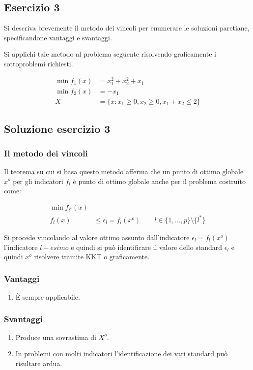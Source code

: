 \documentclass[\main/main.tex]{subfiles}
\begin{document}
\subsection{Esercizio 3}
Si descriva brevemente il metodo dei vincoli per enumerare le soluzioni paretiane, specificandone vantaggi e svantaggi.

Si applichi tale metodo al problema seguente risolvendo graficamente i sottoproblemi richiesti.

\begin{align*}
  \min f_1(x) & = x_1^2 + x_2^2 + x_1                            \\
  \min f_2(x) & = -x_1                                           \\
  X           & = \{x:x_1 \geq 0, x_2 \geq 0, x_1 + x_2 \leq 2\}
\end{align*}

\subsection{Soluzione esercizio 3}
\subsubsection*{Il metodo dei vincoli}
Il teorema su cui si basa questo metodo afferma che un punto di ottimo globale $x^o$ per gli indicatori $f_l$ è punto di ottimo globale anche per il problema costruito come:

\begin{align*}
  \min f_{l^*}(x)                                                                      \\
  f_l(x) & \leq \epsilon_l = f_l(x^o) \qquad l \in \{1,\ldots,p\}  \setminus \{ l^* \}
\end{align*}

Si procede vincolando al valore ottimo assunto dall'indicatore $\epsilon_l = f_l(x^o)$ l'indicatore $l-esimo$ e quindi si può identificare il valore dello standard $\epsilon_l$ e quindi $x^o$ risolvere tramite KKT o graficamente.

\subsubsection*{Vantaggi}
\begin{enumerate}
  \item È sempre applicabile.
\end{enumerate}

\subsubsection*{Svantaggi}
\begin{enumerate}
  \item Produce una sovrastima di $X^o$.
  \item In problemi con molti indicatori l'identificazione dei vari standard può risultare ardua.
\end{enumerate}
\end{document}
